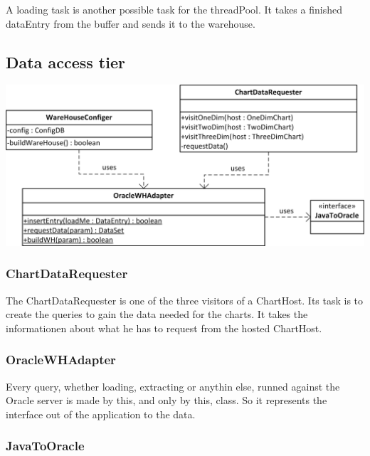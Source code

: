 A loading task is another possible task for the threadPool. It takes a finished dataEntry from the buffer and sends it to the warehouse.




\subsection{Data access tier}

\begin{center}
\includegraphics{Pictures/Parts/Data.png}
\end{center} 

\subsubsection*{ChartDataRequester}

The ChartDataRequester is one of the three visitors of a ChartHost. Its task is to 
create the queries to gain the data needed for the charts. It takes the informationen about what he
has to request from the hosted ChartHost.



\subsubsection*{OracleWHAdapter}

Every query, whether loading, extracting or anythin else, runned against the Oracle server is made by this,
and only by this, class. So it represents the interface out of the application to the data.



\subsubsection*{JavaToOracle}

